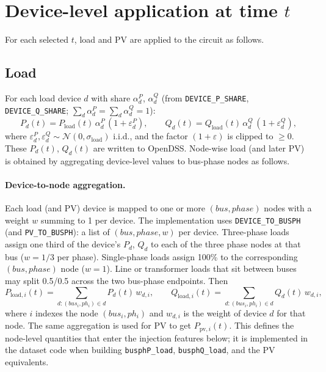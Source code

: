 \documentclass[11pt]{article}
\begin{document}
\section{Device-level application at time $t$}

For each selected $t$, load and PV are applied to the circuit as follows.

\subsection{Load}

For each load device $d$ with share $\alpha_d^P$, $\alpha_d^Q$ (from \texttt{DEVICE\_P\_SHARE}, \texttt{DEVICE\_Q\_SHARE}; $\sum_d \alpha_d^P = \sum_d \alpha_d^Q = 1$):
\begin{equation}
  P_d(t) = P_{\mathrm{load}}(t)\, \alpha_d^P\, (1 + \varepsilon_d^P), \qquad
  Q_d(t) = Q_{\mathrm{load}}(t)\, \alpha_d^Q\, (1 + \varepsilon_d^Q),
\end{equation}
where $\varepsilon_d^P, \varepsilon_d^Q \sim \mathcal{N}(0, \sigma_{\mathrm{load}})$ i.i.d., and the factor $(1+\varepsilon)$ is clipped to $\ge 0$. These $P_d(t)$, $Q_d(t)$ are written to OpenDSS. Node-wise load (and later PV) is obtained by aggregating device-level values to bus-phase nodes as follows.

\paragraph{Device-to-node aggregation.} Each load (and PV) device is mapped to one or more $(bus, phase)$ nodes with a weight $w$ summing to 1 per device. The implementation uses \texttt{DEVICE\_TO\_BUSPH} (and \texttt{PV\_TO\_BUSPH}): a list of $(bus, phase, w)$ per device. Three-phase loads assign one third of the device's $P_d$, $Q_d$ to each of the three phase nodes at that bus ($w = 1/3$ per phase). Single-phase loads assign 100\% to the corresponding $(bus, phase)$ node ($w = 1$). Line or transformer loads that sit between buses may split 0.5/0.5 across the two bus-phase endpoints. Then
\begin{equation}
  P_{\mathrm{load},i}(t) = \sum_{d \colon (bus_i, ph_i) \in d} P_d(t)\, w_{d,i}, \qquad
  Q_{\mathrm{load},i}(t) = \sum_{d \colon (bus_i, ph_i) \in d} Q_d(t)\, w_{d,i},
\end{equation}
where $i$ indexes the node $(bus_i, ph_i)$ and $w_{d,i}$ is the weight of device $d$ for that node. The same aggregation is used for PV to get $P_{\mathrm{pv},i}(t)$. This defines the node-level quantities that enter the injection features below; it is implemented in the dataset code when building \texttt{busphP\_load}, \texttt{busphQ\_load}, and the PV equivalents.
\end{document}
